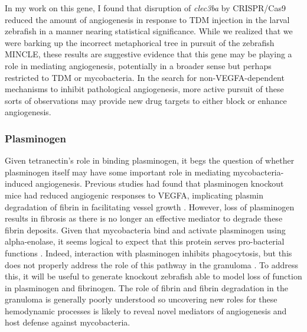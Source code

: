 In my work on this gene, I found that disruption of \textit{clec3ba} by CRISPR/Cas9 reduced the amount of angiogenesis in response to TDM injection in the larval zebrafish in a manner nearing statistical significance. While we realized that we were barking up the incorrect metaphorical tree in pursuit of the zebrafish MINCLE, these results are suggestive evidence that this gene may be playing a role in mediating angiogenesis, potentially in a broader sense but perhaps restricted to TDM or mycobacteria. In the search for non\hyp{}VEGFA\hyp{}dependent mechanisms to inhibit pathological angiogenesis, more active pursuit of these sorts of observations may provide new drug targets to either block or enhance angiogenesis. 

\subsubsection{Plasminogen}\label{plg}

Given tetranectin's role in binding plasminogen, it begs the question of whether plasminogen itself may have some important role in mediating mycobacteria\hyp{}induced angiogenesis. Previous studies had found that plasminogen knockout mice had reduced angiogenic responses to VEGFA, implicating plasmin degradation of fibrin in facilitating vessel growth \citep{Oh2003}. However, loss of plasminogen results in fibrosis as there is no longer an effective mediator to degrade these fibrin deposits. Given that mycobacteria bind and activate plasminogen using alpha\hyp{}enolase, it seems logical to expect that this protein serves pro\hyp{}bacterial functions \citep{Monroy2000}. Indeed, interaction with plasminogen inhibits phagocytosis, but this does not properly address the role of this pathway in the granuloma \citep{EcheverriaValencia2019}. To address this, it will be useful to generate knockout zebrafish able to model loss of function in plasminogen and fibrinogen. The role of fibrin and fibrin degradation in the granuloma is generally poorly understood so uncovering new roles for these hemodynamic processes is likely to reveal novel mediators of angiogenesis and host defense against mycobacteria.

